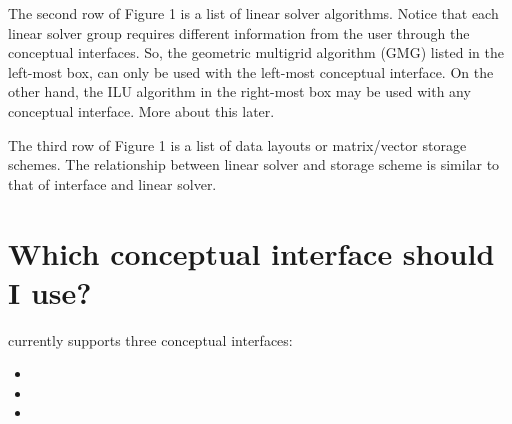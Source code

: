 The second row of Figure 1 is a list of linear solver algorithms.   Notice that
each linear solver group requires different information from the user through
the conceptual interfaces.  So, the geometric multigrid algorithm (GMG) listed
in the left-most box, can only be used with the left-most conceptual
interface.  On the other hand, the ILU algorithm in the right-most box may be
used with any conceptual interface.  More about this later.

The third row of Figure 1 is a list of data layouts or matrix/vector storage
schemes.  The relationship between linear solver and storage scheme is similar
to that of interface and linear solver.


\section{Which conceptual interface should I use?}

\hypre currently supports three conceptual interfaces:

\begin{itemize}

\item
{}

\item
{}

\item
{}

\end{itemize}